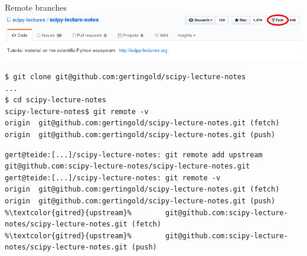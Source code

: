 \documentclass[svgnames]{beamer}
\begin{document}
\begin{frame}[fragile]{Remote branches}
 \includegraphics[width=\textwidth]{fork}

 \addtolength\linewidth{0.5truecm}
 \begin{lstlisting}[basicstyle={\ttfamily\tiny}]
$ git clone git@github.com:gertingold/scipy-lecture-notes
...
$ cd scipy-lecture-notes
scipy-lecture-notes$ git remote -v
origin  git@github.com:gertingold/scipy-lecture-notes.git (fetch)
origin  git@github.com:gertingold/scipy-lecture-notes.git (push)
 \end{lstlisting}


 \begin{lstlisting}[basicstyle={\ttfamily\tiny}, breaklines=true, escapechar=\%]
gert@teide:[...]/scipy-lecture-notes: git remote add upstream git@github.com:scipy-lecture-notes/scipy-lecture-notes.git
gert@teide:[...]/scipy-lecture-notes: git remote -v
origin  git@github.com:gertingold/scipy-lecture-notes.git (fetch)
origin  git@github.com:gertingold/scipy-lecture-notes.git (push)
%\textcolor{gitred}{upstream}%        git@github.com:scipy-lecture-notes/scipy-lecture-notes.git (fetch)
%\textcolor{gitred}{upstream}%        git@github.com:scipy-lecture-notes/scipy-lecture-notes.git (push)
 \end{lstlisting}
\end{frame}
\end{document}
